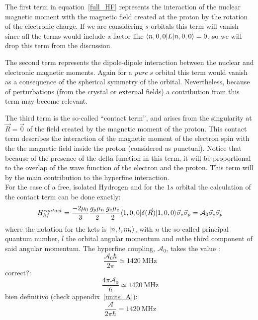 The first term in equation~\eqref{full_HF} represents the interaction of the nuclear magnetic moment with the magnetic field created at the proton by the rotation of the electronic charge. If we are considering $s$ orbitals this term will vanish since all the terms would include a factor like $\langle n,0,0|L|n,0,0\rangle = 0$, so we will drop this term from the discussion.

The second term represents the dipole-dipole interaction between the nuclear and electronic magnetic moments. Again for a \textit{pure} $s$ orbital this term would vanish as a consequence of the spherical symmetry of the orbital. Nevertheless, because of perturbations (from the crystal or external fields) a contribution from this term may become relevant. 

The third term is the so-called ``contact term'', and arises from the singularity at $\vec{R}=\vec{0}$ of the field created by the magnetic moment of the proton.
This contact term describes the interaction of the magnetic moment of the electron spin with the the magnetic field inside the proton (considered as punctual). Notice that because of the presence of the delta function in this term, it will be proportional to the overlap of the wave function of the electron and the proton. This term will by the main contribution to the hyperfine interaction.\\

For the case of a free, isolated Hydrogen and for the $1s$ orbital the calculation of the contact term can be done exactly:
\begin{equation}
H^{contact}_{hf} =
\frac{-2\mu_0}{3}\frac{g_{p}\mu_{n}}{2}
\frac{g_{e}\mu_{e}}{2} \langle1,0,0|\delta(\vec{R})
|1,0,0\rangle  \vec{\sigma}_e\vec{\sigma}_p =
\mathcal{A}_{0}\vec{\sigma}_e\vec{\sigma}_p
\end{equation}
where the notation for the kets is $|n,l,m_{l}\rangle$, with $n$ the so-called principal quantum number, $l$ the orbital angular momentum and $m $the third component of said angular momentum. The hyperfine coupling, $\mathcal{A}_{0}$, takes the value : %
\begin{equation}
\frac{\mathcal{A}_{0}\hbar}{2\pi} \simeq \SI{1420}{\MHz}
\end{equation}
correct?:
\begin{equation}
\frac{4\pi\mathcal{A}_{0}}{\hbar} \simeq \SI{1420}{\MHz}
\end{equation}
bien definitivo (check appendix~\ref{units_A}):
\begin{equation}
  \frac{\mathcal{A}}{2\pi\hbar} = \SI{1420}{\MHz}
\end{equation}

